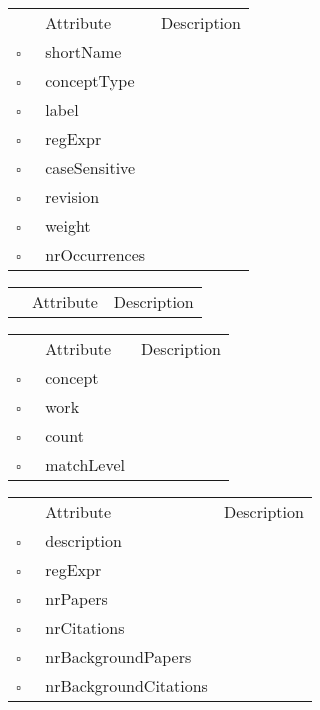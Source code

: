 \begin{table}
\caption{Concept  }

\begin{longtable}{llp{8cm}}
& Attribute & Description \\
$\square$\ & shortName &  \\
$\square$\ & conceptType &  \\
$\square$\ & label &  \\
$\square$\ & regExpr &  \\
$\square$\ & caseSensitive &  \\
$\square$\ & revision &  \\
$\square$\ & weight &  \\
$\square$\ & nrOccurrences &  \\
\end{longtable}
\label{attr:Concept}
\end{table}

\begin{table}
\caption{ConceptType  }

\begin{longtable}{llp{8cm}}
& Attribute & Description \\
\end{longtable}
\label{attr:ConceptType}
\end{table}

\begin{table}
\caption{ConceptWork  }

\begin{longtable}{llp{8cm}}
& Attribute & Description \\
$\square$\ & concept &  \\
$\square$\ & work &  \\
$\square$\ & count &  \\
$\square$\ & matchLevel &  \\
\end{longtable}
\label{attr:ConceptWork}
\end{table}

\begin{table}
\caption{ConferenceSeries  }

\begin{longtable}{llp{8cm}}
& Attribute & Description \\
$\square$\ & description &  \\
$\square$\ & regExpr &  \\
$\square$\ & nrPapers &  \\
$\square$\ & nrCitations &  \\
$\square$\ & nrBackgroundPapers &  \\
$\square$\ & nrBackgroundCitations &  \\
\end{longtable}
\label{attr:ConferenceSeries}
\end{table}

